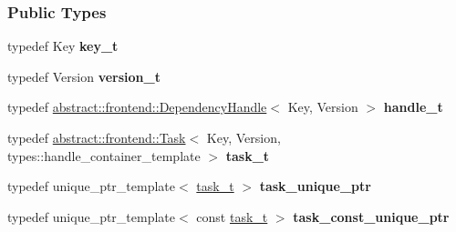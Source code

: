 \subsubsection*{Public Types}
\begin{DoxyCompactItemize}
\item 
typedef Key {\bfseries key\+\_\+t}\hypertarget{classdarma__runtime_1_1abstract_1_1backend_1_1_runtime_a68a07863baaa1231459b18e89d03591d}{}\label{classdarma__runtime_1_1abstract_1_1backend_1_1_runtime_a68a07863baaa1231459b18e89d03591d}

\item 
typedef Version {\bfseries version\+\_\+t}\hypertarget{classdarma__runtime_1_1abstract_1_1backend_1_1_runtime_ab2b7bd7e3f4558439e6d7990f3bca5a9}{}\label{classdarma__runtime_1_1abstract_1_1backend_1_1_runtime_ab2b7bd7e3f4558439e6d7990f3bca5a9}

\item 
typedef \hyperlink{classdarma__runtime_1_1abstract_1_1frontend_1_1_dependency_handle}{abstract\+::frontend\+::\+Dependency\+Handle}$<$ Key, Version $>$ {\bfseries handle\+\_\+t}\hypertarget{classdarma__runtime_1_1abstract_1_1backend_1_1_runtime_a4b8adeddf52a86f7bb088121f7fa844c}{}\label{classdarma__runtime_1_1abstract_1_1backend_1_1_runtime_a4b8adeddf52a86f7bb088121f7fa844c}

\item 
typedef \hyperlink{classdarma__runtime_1_1abstract_1_1frontend_1_1_task}{abstract\+::frontend\+::\+Task}$<$ Key, Version, types\+::handle\+\_\+container\+\_\+template $>$ {\bfseries task\+\_\+t}\hypertarget{classdarma__runtime_1_1abstract_1_1backend_1_1_runtime_a921338d08fd71b75bdba39853bdafbe3}{}\label{classdarma__runtime_1_1abstract_1_1backend_1_1_runtime_a921338d08fd71b75bdba39853bdafbe3}

\item 
typedef unique\+\_\+ptr\+\_\+template$<$ \hyperlink{classdarma__runtime_1_1abstract_1_1frontend_1_1_task}{task\+\_\+t} $>$ {\bfseries task\+\_\+unique\+\_\+ptr}\hypertarget{classdarma__runtime_1_1abstract_1_1backend_1_1_runtime_ab566617d2c90c79dae40da7e17add6b5}{}\label{classdarma__runtime_1_1abstract_1_1backend_1_1_runtime_ab566617d2c90c79dae40da7e17add6b5}

\item 
typedef unique\+\_\+ptr\+\_\+template$<$ const \hyperlink{classdarma__runtime_1_1abstract_1_1frontend_1_1_task}{task\+\_\+t} $>$ {\bfseries task\+\_\+const\+\_\+unique\+\_\+ptr}\hypertarget{classdarma__runtime_1_1abstract_1_1backend_1_1_runtime_ac4caeb318d06ed0d40e1e7624875b376}{}\label{classdarma__runtime_1_1abstract_1_1backend_1_1_runtime_ac4caeb318d06ed0d40e1e7624875b376}

\end{DoxyCompactItemize}
